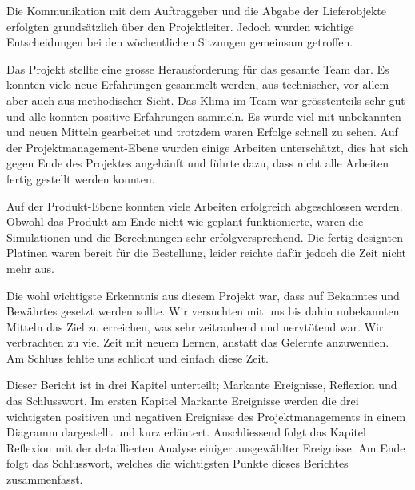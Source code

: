 Die  Kommunikation  mit dem  Auftraggeber  und  die Abgabe  der  Lieferobjekte
erfolgten  grunds\"atzlich \"uber  den  Projektleiter. Jedoch wurden  wichtige
Entscheidungen bei den w\"ochentlichen Sitzungen gemeinsam getroffen.

Das Projekt stellte eine grosse Herausforderung f\"ur das gesamte Team dar. Es
konnten viele  neue Erfahrungen gesammelt  werden, aus technischer,  vor allem
aber  auch  aus methodischer  Sicht. Das  Klima  im Team  war  gr\"osstenteils
sehr  gut und  alle konnten  positive Erfahrungen  sammeln. Es wurde  viel mit
unbekannten und neuen Mitteln gearbeitet und trotzdem waren Erfolge schnell zu
sehen. Auf der Projektmanagement-Ebene  wurden einige Arbeiten untersch\"atzt,
dies hat  sich gegen Ende  des Projektes  angeh\"auft und f\"uhrte  dazu, dass
nicht alle Arbeiten fertig gestellt werden konnten.

Auf  der  Produkt-Ebene  konnten   viele  Arbeiten  erfolgreich  abgeschlossen
werden. Obwohl  das Produkt  am Ende  nicht wie  geplant funktionierte,  waren
die  Simulationen und  die  Berechnungen  sehr erfolgversprechend. Die  fertig
designten Platinen waren  bereit f\"ur die Bestellung,  leider reichte daf\"ur
jedoch die Zeit nicht mehr aus.

Die  wohl wichtigste  Erkenntnis aus  diesem Projekt  war, dass  auf Bekanntes
und  Bew\"ahrtes  gesetzt werden  sollte. Wir  versuchten  mit uns  bis  dahin
unbekannten  Mitteln  das   Ziel  zu  erreichen,  was   sehr  zeitraubend  und
nervt\"otend war. Wir verbrachten  zu viel Zeit mit neuem  Lernen, anstatt das
Gelernte anzuwenden. Am Schluss fehlte uns schlicht und einfach diese Zeit.

Dieser Bericht ist in drei  Kapitel unterteilt; Markante Ereignisse, Reflexion
und das  Schlusswort. Im ersten  Kapitel Markante  Ereignisse werden  die drei
wichtigsten positiven und negativen Ereignisse des Projektmanagements in einem
Diagramm  dargestellt und  kurz erl\"autert. Anschliessend  folgt das  Kapitel
Reflexion mit der detaillierten  Analyse einiger ausgew\"ahlter Ereignisse. Am
Ende folgt  das Schlusswort, welches  die wichtigsten Punkte  dieses Berichtes
zusammenfasst.

